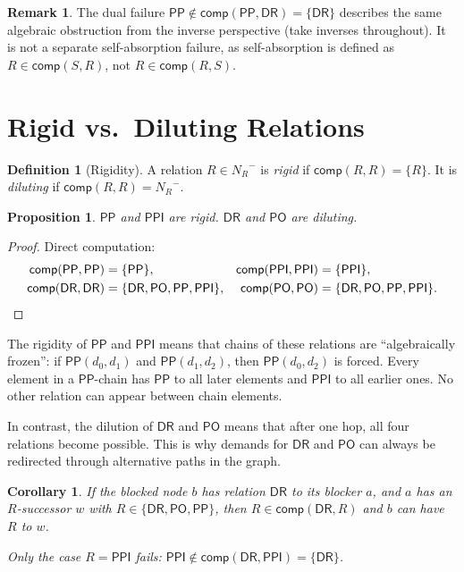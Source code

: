 \documentclass[a4paper,11pt]{article}
\newtheorem{proposition}[theorem]{Proposition}
\newtheorem{corollary}[theorem]{Corollary}
\theoremstyle{definition}
\newtheorem{definition}[theorem]{Definition}
\newtheorem{remark}[theorem]{Remark}
\newcommand{\NR}{\ensuremath{N_R}}
\newcommand{\DR}{\ensuremath{\mathsf{DR}}}
\newcommand{\PO}{\ensuremath{\mathsf{PO}}}
\newcommand{\PP}{\ensuremath{\mathsf{PP}}}
\newcommand{\PPI}{\ensuremath{\mathsf{PPI}}}
\newcommand{\comp}{\ensuremath{\mathsf{comp}}}
\begin{document}
\begin{remark}
The dual failure $\PP \notin \comp(\PP, \DR) = \{\DR\}$ describes
the same algebraic obstruction from the inverse perspective (take
inverses throughout).  It is not a separate self-absorption failure,
as self-absorption is defined as $R \in \comp(S, R)$, not
$R \in \comp(R, S)$.
\end{remark}


\section{Rigid vs.\ Diluting Relations}
\label{sec:rigid}

\begin{definition}[Rigidity]
A relation $R \in \NR^{-}$ is \emph{rigid} if $\comp(R, R) = \{R\}$.
It is \emph{diluting} if $\comp(R, R) = \NR^{-}$.
\end{definition}

\begin{proposition}
\label{prop:rigid}
$\PP$ and $\PPI$ are rigid.  $\DR$ and $\PO$ are diluting.
\end{proposition}

\begin{proof}
Direct computation:
\begin{align*}
  \comp(\PP, \PP)   &= \{\PP\},  &
  \comp(\PPI, \PPI) &= \{\PPI\}, \\
  \comp(\DR, \DR)   &= \{\DR, \PO, \PP, \PPI\},  &
  \comp(\PO, \PO)   &= \{\DR, \PO, \PP, \PPI\}. \qedhere
\end{align*}
\end{proof}

The rigidity of $\PP$ and $\PPI$ means that chains of these
relations are ``algebraically frozen'': if $\PP(d_0, d_1)$ and
$\PP(d_1, d_2)$, then $\PP(d_0, d_2)$ is forced.  Every element
in a $\PP$-chain has $\PP$ to all later elements and $\PPI$ to
all earlier ones.  No other relation can appear between chain
elements.

In contrast, the dilution of $\DR$ and $\PO$ means that after
one hop, all four relations become possible.  This is why demands
for $\DR$ and $\PO$ can always be redirected through alternative
paths in the graph.

\begin{corollary}
\label{cor:dilution}
If the blocked node $b$ has relation $\DR$ to its blocker $a$,
and $a$ has an $R$-successor $w$ with $R \in \{\DR, \PO, \PP\}$,
then $R \in \comp(\DR, R)$ and $b$ can have $R$ to $w$.

Only the case $R = \PPI$ fails:
$\PPI \notin \comp(\DR, \PPI) = \{\DR\}$.
\end{corollary}
\end{document}
